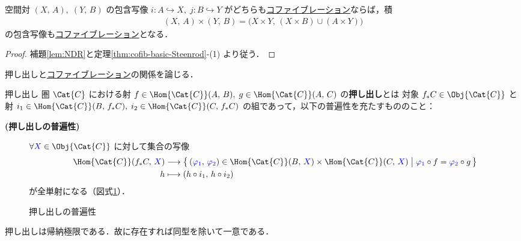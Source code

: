 \documentclass[algtopo_main]{subfiles}
\begin{document}
\begin{mycol}[]{}
    空間対 $(X,\, A),\; (Y,\, B)$ の包含写像 $i \colon A \hookrightarrow X,\; j \colon B \hookrightarrow Y$ がどちらも\hyperref[def:cofibration]{コファイブレーション}ならば，積
    \begin{align}
        (X,\, A) \times (Y,\, B) = \bigl( X \times Y ,\, (X \times B) \cup (A \times Y) \bigr) 
    \end{align}
    の包含写像も\hyperref[def:cofibration]{コファイブレーション}となる．
\end{mycol}

\begin{proof}
    補題\ref{lem:NDR}と定理\ref{thm:cofib-basic-Steenrod}-(1) より従う．
\end{proof}

押し出しと\hyperref[def:cofibration]{コファイブレーション}の関係を論じる．

\begin{mydef}[label=def:pushout]{押し出し}
    圏 $\Cat{C}$ における射 $f \in \Hom{\Cat{C}}(A,\, B),\; g \in \Hom{\Cat{C}}(A,\, C)$ の\textbf{押し出し}とは
    対象 $f_*C \in \Obj{\Cat{C}}$ と射 $i_1 \in \Hom{\Cat{C}}(B,\, f_*C),\; i_2 \in \Hom{\Cat{C}} (C,\, f_*C)$ の組であって，以下の普遍性を充たすもののこと：
    \begin{description}
        \item[\textbf{(押し出しの普遍性)}] 
        $\forall \textcolor{blue}{X} \in \Obj{\Cat{C}}$ に対して集合の写像
        \begin{align}
            \Hom{\Cat{C}} (f_*C,\, \textcolor{blue}{X}) &\lto \bigl\{\, (\textcolor{blue}{\varphi_1},\, \textcolor{blue}{\varphi_2}) \in \Hom{\Cat{C}}(B,\, \textcolor{blue}{X}) \times \Hom{\Cat{C}} (C,\, \textcolor{blue}{X}) \bigm| \textcolor{blue}{\varphi_1} \circ f = \textcolor{blue}{\varphi_2} \circ g \,\bigr\} \\
            h &\lmto (h \circ i_1,\, h \circ i_2)
        \end{align}
        が全単射になる（図式\ref{cmtd:pushout}）．
    \end{description}
    
\end{mydef}

\begin{figure}[H]
    \centering
    \caption{押し出しの普遍性}
    \label{cmtd:pushout}
\end{figure}%
押し出しは帰納極限である．故に存在すれば同型を除いて一意である．
\end{document}
